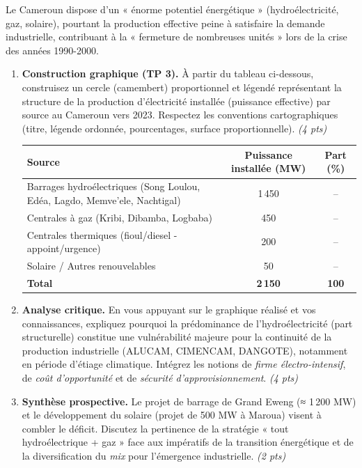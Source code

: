 \documentclass[11pt]{article}
\begin{document}
\begin{exercice}
Le Cameroun dispose d'un « énorme potentiel énergétique » (hydroélectricité, gaz, solaire), pourtant la production effective peine à satisfaire la demande industrielle, contribuant à la « fermeture de nombreuses unités » lors de la crise des années 1990-2000.

\begin{enumerate}
    \item \textbf{Construction graphique (TP 3).} À partir du tableau ci-dessous, construisez un cercle (camembert) proportionnel et légendé représentant la structure de la production d'électricité installée (puissance effective) par source au Cameroun vers 2023. Respectez les conventions cartographiques (titre, légende ordonnée, pourcentages, surface proportionnelle). \textit{(4 pts)}
    
    \begin{center}
    \begin{tabular}{|l|c|c|}
    \hline
    \textbf{Source} & \textbf{Puissance installée (MW)} & \textbf{Part (\%)} \\
    \hline
    Barrages hydroélectriques (Song Loulou, Edéa, Lagdo, Memve'ele, Nachtigal) & 1\,450 & -- \\
    Centrales à gaz (Kribi, Dibamba, Logbaba) & 450 & -- \\
    Centrales thermiques (fioul/diesel - appoint/urgence) & 200 & -- \\
    Solaire / Autres renouvelables & 50 & -- \\
    \hline
    \textbf{Total} & \textbf{2\,150} & \textbf{100} \\
    \hline
    \end{tabular}
    \end{center}

    \item \textbf{Analyse critique.} En vous appuyant sur le graphique réalisé et vos connaissances, expliquez pourquoi la prédominance de l'hydroélectricité (part structurelle) constitue une vulnérabilité majeure pour la continuité de la production industrielle (ALUCAM, CIMENCAM, DANGOTE), notamment en période d'étiage climatique. Intégrez les notions de \textit{firme électro-intensif}, de \textit{coût d'opportunité} et de \textit{sécurité d'approvisionnement}. \textit{(4 pts)}

    \item \textbf{Synthèse prospective.} Le projet de barrage de Grand Eweng (≈ 1\,200 MW) et le développement du solaire (projet de 500 MW à Maroua) visent à combler le déficit. Discutez la pertinence de la stratégie « tout hydroélectrique + gaz » face aux impératifs de la transition énergétique et de la diversification du \textit{mix} pour l'émergence industrielle. \textit{(2 pts)}
\end{enumerate}
\end{exercice}
\end{document}
